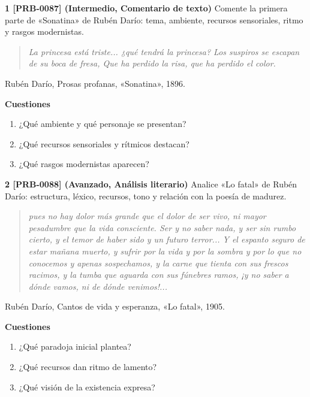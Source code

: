 \documentclass{book}
\begin{document}
\begin{tcolorbox}[title={Ejercicios}, studiumworked, breakable]

\noindent\textbf{1 [PRB-0087] (Intermedio, Comentario de texto)}
Comente la primera parte de «Sonatina» de Rubén Darío: tema, ambiente, recursos sensoriales, ritmo y rasgos modernistas.


\begin{quote}
\itshape La princesa está triste... ¿qué tendrá la princesa? Los suspiros se escapan de su boca de fresa, Que ha perdido la risa, que ha perdido el color.
\end{quote}
{\noindent\footnotesize Rubén Darío, Prosas profanas, «Sonatina», 1896.\par}

\noindent\textbf{Cuestiones}
\begin{enumerate}
\item ¿Qué ambiente y qué personaje se presentan?
\item ¿Qué recursos sensoriales y rítmicos destacan?
\item ¿Qué rasgos modernistas aparecen?
\end{enumerate}

\noindent\textbf{2 [PRB-0088] (Avanzado, Análisis literario)}
Analice «Lo fatal» de Rubén Darío: estructura, léxico, recursos, tono y relación con la poesía de madurez.


\begin{quote}
\itshape pues no hay dolor más grande que el dolor de ser vivo, ni mayor pesadumbre que la vida consciente. Ser y no saber nada, y ser sin rumbo cierto, y el temor de haber sido y un futuro terror... Y el espanto seguro de estar mañana muerto, y sufrir por la vida y por la sombra y por lo que no conocemos y apenas sospechamos, y la carne que tienta con sus frescos racimos, y la tumba que aguarda con sus fúnebres ramos, ¡y no saber a dónde vamos, ni de dónde venimos!...
\end{quote}
{\noindent\footnotesize Rubén Darío, Cantos de vida y esperanza, «Lo fatal», 1905.\par}

\noindent\textbf{Cuestiones}
\begin{enumerate}
\item ¿Qué paradoja inicial plantea?
\item ¿Qué recursos dan ritmo de lamento?
\item ¿Qué visión de la existencia expresa?
\end{enumerate}


\end{tcolorbox}
\end{document}
